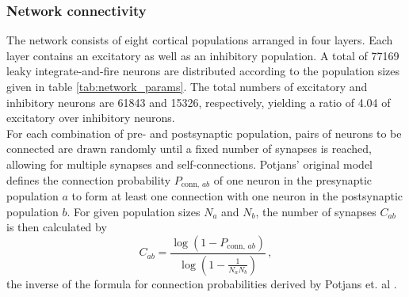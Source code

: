 \subsubsection{Network connectivity}
The network consists of eight cortical populations arranged in four 
layers. Each layer contains an excitatory as well as an inhibitory population. 
A total of 77169 leaky integrate-and-fire neurons are distributed according to the population
sizes given in table \ref{tab:network_params}. The total numbers of excitatory and inhibitory 
neurons are 61843 and 15326, respectively, yielding a ratio of 4.04 of excitatory over inhibitory
neurons. \\
For each combination of pre- and postsynaptic population, pairs of neurons to be connected are drawn
randomly until a fixed number of synapses is reached, allowing for multiple synapses and 
self-connections. Potjans' original model defines the connection probability $P_{\text{conn}, \,ab}$ 
of one neuron in the presynaptic population $a$ to form at least one connection with one neuron in 
the postsynaptic population $b$. For given population sizes $N_a$ and $N_b$, the number of 
synapses $C_{ab}$ is then calculated by
\begin{equation}
    C_{ab} = \frac{\log \left( 1 - P_{\text{conn}, \,ab} \right)}{\log \left( 1 - \frac{1}{N_a N_b} \right)} \, ,
    \label{eq:synapse_numbers}
\end{equation}
the inverse of the formula for connection probabilities derived by Potjans et. al \cite{potjans2014}.

